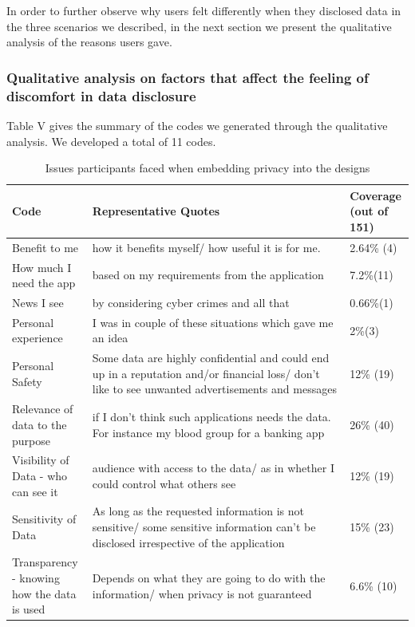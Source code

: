 \documentclass[conference]{IEEEtran}
\begin{document}
In order to further observe why users felt differently when they disclosed data in the three scenarios we described, in the next section we present the qualitative analysis of the reasons users gave.

\subsubsection{Qualitative analysis on factors that affect the feeling of discomfort in data disclosure}

Table V gives the summary of the codes we generated through the qualitative analysis. We developed a total of 11 codes.

\begin{center}
\begin{table}[htbp]
\caption{Issues participants faced when embedding privacy into the designs}
\begin{center}
\begin{adjustbox}{width=1\textwidth}
\begin{tabular}{|p{0.20\linewidth}|p{0.64\linewidth}|p{0.16\linewidth}|}
\hline
Code &  Representative Quotes & Coverage (out of 151)\\
\hline
Benefit to me &how it benefits myself/ how useful it is for me. & 2.64\% (4)\\
\hline
How much I need the app &  based on my requirements from the application & 7.2\%(11)\\
\hline
News I see  & by considering cyber crimes and all that & 0.66\%(1) \\
\hline
Personal experience &  I was in couple of these situations which gave me an idea & 2\%(3) \\
\hline
Personal Safety & Some data are highly confidential and could end up in a reputation and/or financial loss/  don't like to see unwanted advertisements and messages & 12\% (19)\\ 
\hline
Relevance of data to the purpose &if I don't think such applications needs the data. For instance my blood group for a banking app
 & 26\% (40)\\ 
\hline
Visibility of Data - who can see it & audience with access to the data/ as in whether I could control what others see & 12\% (19)\\ 
\hline
Sensitivity of Data & As long as the requested information is not sensitive/  some sensitive information can't be disclosed irrespective of the application
 & 15\% (23)\\ 
\hline
Transparency - knowing how the data is used & Depends on what they are going to do with the information/ when privacy is not guaranteed & 6.6\% (10)\\ 

\end{tabular}
\end{adjustbox}
\end{center}
\end{table}
\end{center}
\end{document}

